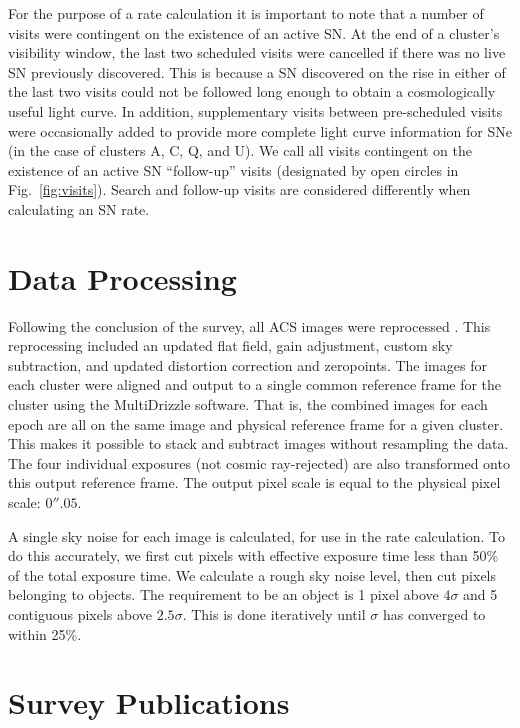 For the purpose of a rate calculation it is important to note that a
number of visits were contingent on the existence of an active SN. At
the end of a cluster's visibility window, the last two scheduled
visits were cancelled if there was no live SN previously
discovered. This is because a SN discovered on the rise in either of
the last two visits could not be followed long enough to obtain a
cosmologically useful light curve. In addition, supplementary visits
between pre-scheduled visits were occasionally added to provide more
complete light curve information for SNe (in the case of clusters A,
C, Q, and U). We call all visits contingent on the existence of an
active SN ``follow-up'' visits (designated by open circles in
Fig.~\ref{fig:visits}). Search and follow-up visits are considered
differently when calculating an SN rate.

\section{Data Processing}

Following the conclusion of the survey, all ACS images were
reprocessed \citep[see details in][]{suzuki11a}. This
reprocessing included an updated flat field, gain adjustment, custom
sky subtraction, and updated distortion correction and zeropoints.
The images for each cluster were aligned and output to a single common
reference frame for the cluster using the {\sc MultiDrizzle}
software. That is, the combined images for each epoch are all on the
same image and physical reference frame for a given cluster. This
makes it possible to stack and subtract images without resampling the
data. The four individual exposures (not cosmic ray-rejected) are also
transformed onto this output reference frame. The output pixel scale
is equal to the physical pixel scale: $0''.05$.

A single sky noise for each image is calculated, for use in the rate
calculation. To do this accurately, we first cut pixels with effective
exposure time less than 50\% of the total exposure time. We calculate
a rough sky noise level, then cut pixels belonging to objects. The
requirement to be an object is 1 pixel above $4\sigma$ and 5
contiguous pixels above $2.5\sigma$. This is done iteratively until
$\sigma$ has converged to within 25\%.

\section{Survey Publications}

